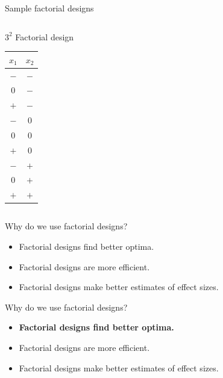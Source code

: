 \documentclass[10pt]{beamer}
\newcommand\lo{\ensuremath{\boldsymbol{-}}}
\newcommand\hi{\ensuremath{\boldsymbol{+}}}
\begin{document}
\begin{frame}{Sample factorial designs}
\begin{columns}
\begin{column}{0.3\textwidth}
\begin{center}
$3^2$ Factorial design\\
\begin{tabular}{cc}
$x_1$ & $x_2$ \\
\hline
\lo & \lo \\
0 & \lo \\
\hi & \lo \\
\lo & 0 \\
0 & 0 \\
\hi & 0 \\
\lo & \hi \\
0 & \hi \\
\hi & \hi \\
\end{tabular}
\end{center}
\end{column}

\end{columns}
	
\end{frame}


\begin{frame}{Why do we use factorial designs?}

\begin{itemize}
\item Factorial designs find better optima.
\item Factorial designs are more efficient.
\item Factorial designs make better estimates of effect sizes.
\end{itemize}

\end{frame}

\begin{frame}{Why do we use factorial designs?}

\begin{itemize}
\item
  \textbf{Factorial designs find better optima.}
\item
  Factorial designs are more efficient.
\item
  Factorial designs make better estimates of effect sizes.
\end{itemize}

\end{frame}
\end{document}
